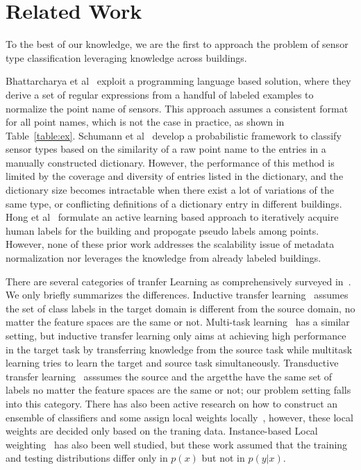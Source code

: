 \section{Related Work}
To the best of our knowledge, we are the first to approach the problem of sensor type classification leveraging knowledge across buildings.

Bhattarcharya et al~\cite{arka} exploit a programming language based solution, 
where they derive a set of regular expressions from a handful of labeled examples 
to normalize the point name of sensors. 
This approach assumes a consistent format for all point names, which is not the case in practice, as shown in Table~\ref{table:ex}. 
Schumann et al~\cite{ibm} develop a probabilistic framework to classify sensor types 
based on the similarity of a raw point name to the entries in a manually constructed dictionary. 
However, the performance of this method is limited by the coverage and diversity of entries listed in the dictionary, and the dictionary size becomes intractable when there exist a lot of variations of the same type, or conflicting definitions of a dictionary entry in different buildings.
Hong et al~\cite{cikm} formulate an active learning based approach to iteratively 
acquire human labels for the building and propogate pseudo labels among points.
However, none of these prior work addresses the scalability issue of metadata 
normalization nor leverages the knowledge from already labeled buildings.

There are several categories of tranfer Learning as comprehensively surveyed in~\cite{transfer1}. We only briefly summarizes the differences. Inductive transfer learning~\cite{transfer2} assumes the set of class labels in the target domain is different from the source domain, no matter the feature spaces are the same or not. Multi-task learning~\cite{multitask} has a similar setting, but inductive transfer learning only aims at achieving high performance in the target task by transferring knowledge from the source task while multitask learning tries to learn the target and source task simultaneously. Transductive transfer learning~\cite{transfer3} asssumes the source and the argetthe have the same set of labels no matter the feature spaces are the same or not; our problem setting falls into this category. There has also been active research on how to construct an ensemble of classifiers and some assign local weights locally~\cite{ensem1,ensem2,ensem3}, however, these local weights are decided only based on the traning data.
Instance-based Local weighting~\cite{weight1,weight2,weight3} has also been well studied, but these work assumed that the training and testing distributions differ only in $p(x)$ but not in $p(y|x)$.

